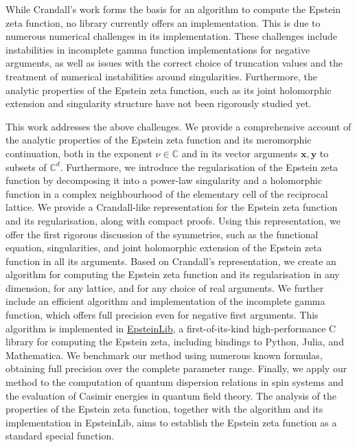 \documentclass[]{amsart}
\newcommand{\new}[1]{#1}
\numberwithin{mythm}{section}
\begin{document}
While Crandall's work forms the basis for an algorithm to compute the Epstein zeta function, no library currently offers an implementation. This is due to numerous numerical challenges in its implementation. These challenges include instabilities in incomplete gamma function implementations for negative arguments, as well as issues with the correct choice of truncation values and the treatment of numerical instabilities around singularities. 
Furthermore, the analytic properties of the Epstein zeta function, such as its joint \new{holomorphic extension} and singularity structure have not been rigorously studied yet.

This work addresses the above challenges. We provide a comprehensive account of the analytic properties of the Epstein zeta function and its meromorphic continuation, both in the exponent $\nu\in\mathds C$ and  
\new{in its vector arguments $\bm x,\bm y$ to subsets of $\mathds C^d$}.
Furthermore, we introduce the regularisation of the Epstein zeta function by decomposing it into a power-law singularity and a holomorphic function in a complex neighbourhood of the elementary cell of the reciprocal lattice.
We provide a Crandall-like representation for the Epstein zeta function and its regularisation, along with compact proofs.
Using this representation, we offer the first rigorous discussion of the symmetries, such as the functional equation, singularities, and \new{joint holomorphic extension} of the Epstein zeta function in all its arguments. 
 Based on Crandall's representation, we create an algorithm for computing the Epstein zeta
function and its regularisation in any dimension, for any lattice, and for any choice of
real arguments. We further include an efficient algorithm and implementation of the incomplete
gamma function, which offers full precision even for negative first arguments.
This algorithm is implemented in \href{https://github.com/epsteinlib/epsteinlib}{EpsteinLib}, a first-of-its-kind high-performance C
library for computing the Epstein zeta, including \new{bindings to Python, Julia, and Mathematica}. We benchmark our method using numerous known formulas, obtaining
full precision over the complete parameter range.
Finally, we apply our method to
the computation of quantum dispersion relations in spin systems and the evaluation
of Casimir energies in quantum field theory. 
The analysis of the properties of the Epstein zeta function, together with the algorithm and its implementation in EpsteinLib, aims to establish the Epstein zeta function as a standard special function.
\end{document}
